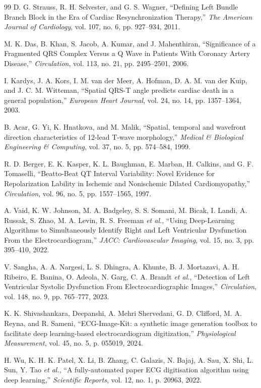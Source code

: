 \begin{thebibliography}{99}
 D. G. Strauss, R. H. Selvester, and G. S. Wagner, ``Defining Left Bundle Branch Block in the Era of Cardiac Resynchronization Therapy,'' \emph{The American Journal of Cardiology}, vol. 107, no. 6, pp. 927--934, 2011.

 M. K. Das, B. Khan, S. Jacob, A. Kumar, and J. Mahenthiran, ``Significance of a Fragmented QRS Complex Versus a Q Wave in Patients With Coronary Artery Disease,'' \emph{Circulation}, vol. 113, no. 21, pp. 2495--2501, 2006.

 I. Kardys, J. A. Kors, I. M. van der Meer, A. Hofman, D. A. M. van der Kuip, and J. C. M. Witteman, ``Spatial QRS-T angle predicts cardiac death in a general population,'' \emph{European Heart Journal}, vol. 24, no. 14, pp. 1357--1364, 2003.

 B. Acar, G. Yi, K. Hnatkova, and M. Malik, ``Spatial, temporal and wavefront direction characteristics of 12-lead T-wave morphology,'' \emph{Medical \& Biological Engineering \& Computing}, vol. 37, no. 5, pp. 574--584, 1999.

 R. D. Berger, E. K. Kasper, K. L. Baughman, E. Marban, H. Calkins, and G. F. Tomaselli, ``Beatto-Beat QT Interval Variability: Novel Evidence for Repolarization Lability in Ischemic and Nonischemic Dilated Cardiomyopathy,'' \emph{Circulation}, vol. 96, no. 5, pp. 1557--1565, 1997.

 A. Vaid, K. W. Johnson, M. A. Badgeley, S. S. Somani, M. Bicak, I. Landi, A. Russak, S. Zhao, M. A. Levin, R. S. Freeman \emph{et al.}, ``Using Deep-Learning Algorithms to Simultaneously Identify Right and Left Ventricular Dysfunction From the Electrocardiogram,'' \emph{JACC: Cardiovascular Imaging}, vol. 15, no. 3, pp. 395--410, 2022.

 V. Sangha, A. A. Nargesi, L. S. Dhingra, A. Khunte, B. J. Mortazavi, A. H. Ribeiro, E. Banina, O. Adeola, N. Garg, C. A. Brandt \emph{et al.}, ``Detection of Left Ventricular Systolic Dysfunction From Electrocardiographic Images,'' \emph{Circulation}, vol. 148, no. 9, pp. 765--777, 2023.

 K. K. Shivashankara, Deepanshi, A. Mehri Shervedani, G. D. Clifford, M. A. Reyna, and R. Sameni, ``ECG-Image-Kit: a synthetic image generation toolbox to facilitate deep learning-based electrocardiogram digitization,'' \emph{Physiological Measurement}, vol. 45, no. 5, p. 055019, 2024.

 H. Wu, K. H. K. Patel, X. Li, B. Zhang, C. Galazis, N. Bajaj, A. Sau, X. Shi, L. Sun, Y. Tao \emph{et al.}, ``A fully-automated paper ECG digitisation algorithm using deep learning,'' \emph{Scientific Reports}, vol. 12, no. 1, p. 20963, 2022.


\end{thebibliography}
